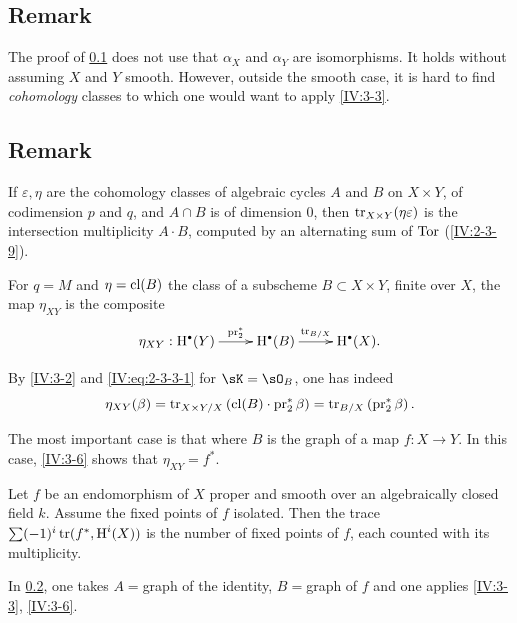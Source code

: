 \subsection{Remark}\label{IV:3-4}

The proof of \ref{IV:3-4} does not use that $\alpha_X$ and $\alpha_Y$ are
isomorphisms. It holds without assuming $X$ and $Y$ smooth. However, outside
the smooth case, it is hard to find \emph{cohomology}
classes to which one would want to apply \ref{IV:3-3}.




\subsection{Remark}\label{IV:3-5}

If $\varepsilon,\eta$ are the cohomology classes of algebraic cycles
$A$ and $B$ on $X\times Y$, of codimension $p$ and $q$, and $A\cap B$ is of
dimension $0$, then $\operatorname{tr}_{X\times Y}(\eta\varepsilon)$ is the intersection
multiplicity $A\cdot B$, computed by an alternating sum of $\operatorname{Tor}$
(\ref{IV:2-3-9}).




\begin{proposition_}\label{IV:3-6}
For $q=M$ and $\eta=\operatorname{cl}(B)$ the class of a subscheme $B\subset X\times Y$,
finite over $X$, the map $\eta_{X Y}$ is the composite
\[\xymatrix{
  \eta_{X Y} : \h^\bullet(Y) \ar[r]^-{\operatorname{pr}_2^\ast}
    & \h^\bullet(B) \ar[r]^-{\tr_{B/X}}
    & \h^\bullet(X) \text{.}
}\]
\end{proposition_}

By \ref{IV:3-2} and \eqref{IV:eq:2-3-3-1} for $\sK=\sO_B$, one has
indeed
\[
  \eta_{X Y}(\beta) = \operatorname{tr}_{X\times Y/X}\left(\operatorname{cl}(B)\cdot \operatorname{pr}_2^\ast\beta\right) = \operatorname{tr}_{B/X}\left(\operatorname{pr}_2^\ast \beta\right) \text{.}
\]

The most important case is that where $B$ is the graph of a map
$f:X\to Y$. In this case, \ref{IV:3-6} shows that $\eta_{X Y}=f^\ast$.




\begin{corollary_}\label{IV:3-7}
Let $f$ be an endomorphism of $X$ proper and smooth over an algebraically
closed field $k$. Assume the fixed points of $f$ isolated. Then the
trace $\sum (-1)^i \operatorname{tr}(f^\ast,\operatorname{H}^i(X))$ is the number of fixed points of $f$,
each counted with its multiplicity.
\end{corollary_}

In \ref{IV:3-5}, one takes $A=$graph of the identity, $B=$graph of $f$ and one
applies \ref{IV:3-3}, \ref{IV:3-6}.




